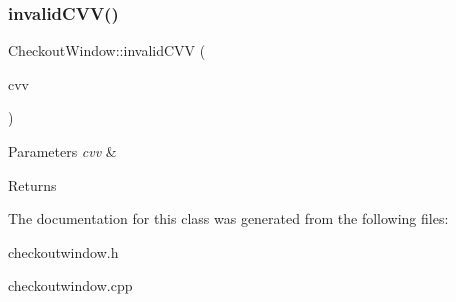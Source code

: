 \subsubsection{\texorpdfstring{invalid\+C\+V\+V()}{invalidCVV()}}
{\footnotesize\ttfamily Checkout\+Window\+::invalid\+C\+VV (\begin{DoxyParamCaption}\item[{Q\+String}]{cvv }\end{DoxyParamCaption})}


\begin{DoxyParams}{Parameters}
{\em cvv} & \\
\hline
\end{DoxyParams}
\begin{DoxyReturn}{Returns}

\end{DoxyReturn}


The documentation for this class was generated from the following files\+:\begin{DoxyCompactItemize}
\item 
checkoutwindow.\+h\item 
checkoutwindow.\+cpp\end{DoxyCompactItemize}
